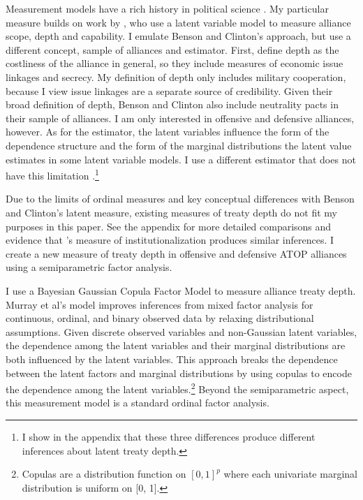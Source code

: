 \documentclass[12pt]{article}
\begin{document}
Measurement models have a rich history in political science \citep{Clintonetal2004, TreierJackman2008, Fariss2014}.
My particular measure builds on work by \citet{BensonClinton2016}, who use a latent variable model \citep{Quinn2004} to measure alliance scope, depth and capability.  
I emulate Benson and Clinton's approach, but use a different concept, sample of alliances and estimator. 
First, \citet{BensonClinton2016} define depth as the costliness of the alliance in general, so they include measures of economic issue linkages and secrecy.
My definition of depth only includes military cooperation, because I view issue linkages are a separate source of credibility. 
Given their broad definition of depth, Benson and Clinton also include neutrality pacts in their sample of alliances.
I am only interested in offensive and defensive alliances, however.  
As for the estimator, the latent variables influence the form of the dependence structure and the form of the marginal distributions the latent value estimates in some latent variable models. 
I use a different estimator that does not have this limitation \citep{Murrayetal2013}.\footnote{I show in the appendix that these three differences produce different inferences about latent treaty depth.}


Due to the limits of ordinal measures and key conceptual differences with Benson and Clinton's latent measure, existing measures of treaty depth do not fit my purposes in this paper. 
See the appendix for more detailed comparisons and evidence that \citet{LeedsAnac2005}'s measure of institutionalization produces similar inferences. 
I create a new measure of treaty depth in offensive and defensive ATOP alliances using a semiparametric factor analysis. 


I use a Bayesian Gaussian Copula Factor Model \citep{Murrayetal2013} to measure alliance treaty depth. 
Murray et al's model improves inferences from mixed factor analysis for continuous, ordinal, and binary observed data by relaxing distributional assumptions.
Given discrete observed variables and non-Gaussian latent variables, the dependence among the latent variables and their marginal distributions are both influenced by the latent variables.
This approach breaks the dependence between the latent factors and marginal distributions by using copulas to encode the dependence among the latent variables.\footnote{Copulas are a distribution function on $[0, 1]^p$ where each univariate marginal distribution is uniform on [0, 1].}
Beyond the semiparametric aspect, this measurement model is a standard ordinal factor analysis.
\end{document}
